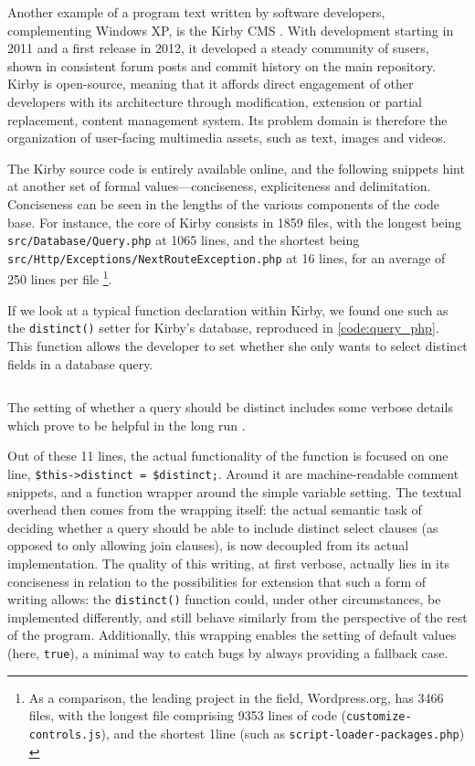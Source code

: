 Another example of a program text written by software developers, complementing Windows XP, is the Kirby CMS \citep{allgeier_kirby_2022}. With development starting in 2011 and a first release in 2012, it developed a steady community of susers, shown in consistent forum posts and commit history on the main repository. Kirby is open-source, meaning that it affords direct engagement of other developers with its architecture through modification, extension or partial replacement, content management system. Its problem domain is therefore the organization of user-facing multimedia assets, such as text, images and videos.

The Kirby source code is entirely available online, and the following snippets hint at another set of formal values—conciseness, expliciteness and delimitation. Conciseness can be seen in the lengths of the various components of the code base. For instance, the core of Kirby consists in 1859 files, with the longest being \lstinline{src/Database/Query.php} at 1065 lines, and the shortest being \lstinline{src/Http/Exceptions/NextRouteException.php} at 16 lines, for an average of 250 lines per file \footnote{As a comparison, the leading project in the field, Wordpress.org, has 3466 files, with the longest file comprising 9353 lines of code (\lstinline{customize-controls.js}), and the shortest 1line (such as \lstinline{script-loader-packages.php}) \citep{wordpress_wordpress_2023}}.

If we look at a typical function declaration within Kirby, we found one such as the \lstinline{distinct()} setter for Kirby's database, reproduced in \ref{code:query_php}. This function allows the developer to set whether she only wants to select distinct fields in a database query.

\begin{listing}
  \inputminted{php}{./corpus/query.php}
  \caption{The setting of whether a query should be distinct includes some verbose details which prove to be helpful in the long run \citep{allgeier_query_2021}.}
  \label{code:query_php}
\end{listing}

Out of these 11 lines, the actual functionality of the function is focused on one line, \lstinline{$this->distinct = $distinct;}. Around it are machine-readable comment snippets, and a function wrapper around the simple variable setting. The textual overhead then comes from the wrapping itself: the actual semantic task of deciding whether a query should be able to include distinct select clauses (as opposed to only allowing join clauses), is now decoupled from its actual implementation. The quality of this writing, at first verbose, actually lies in its conciseness in relation to the possibilities for extension that such a form of writing allows: the \lstinline{distinct()} function could, under other circumstances, be implemented differently, and still behave similarly from the perspective of the rest of the program. Additionally, this wrapping enables the setting of default values (here, \lstinline{true}), a minimal way to catch bugs by always providing a fallback case.

